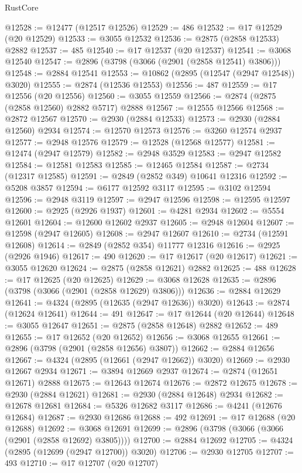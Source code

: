 \begin{lexlean}{RustCore}
\begin{coremodule}
@12528 := @12477 (@12517 @12526)
@12529 := 486
@12532 := @17 @12529 (@20 @12529)
@12533 := @3055 @12532
@12536 := @2875 (@2858 @12533) @2882
@12537 := 485
@12540 := @17 @12537 (@20 @12537)
@12541 := @3068 @12540
@12547 := @2896 (@3798 (@3066 (@2901 (@2858 @12541) @3806)))
@12548 := @2884 @12541
@12553 := @10862 (@2895 (@12547 (@2947 @12548)) @3020)
@12555 := @2874 (@12536 @12553)
@12556 := 487
@12559 := @17 @12556 (@20 @12556)
@12560 := @3055 @12559
@12566 := @2874 (@2875 (@2858 @12560) @2882 @5717) @2888
@12567 := @12555 @12566
@12568 := @2872 @12567
@12570 := @2930 (@2884 @12533)
@12573 := @2930 (@2884 @12560) @2934
@12574 := @12570 @12573
@12576 := @3260 @12574 @2937
@12577 := @2948 @12576
@12579 := @12528 (@12568 @12577)
@12581 := @12474 (@2947 @12579)
@12582 := @2948 @3529
@12583 := @2947 @12582
@12584 := @12581 @12583
@12585 := @12465 @12584
@12587 := @2734 (@12317 @12585)
@12591 := @2849 (@2852 @349) @10641 @12316
@12592 := @5208 @3857
@12594 := @6177 @12592 @3117
@12595 := @3102 @12594
@12596 := @2948 @3119
@12597 := @2947 @12596
@12598 := @12595 @12597
@12600 := @2925 (@2926 @1937)
@12601 := @4281 @2934
@12602 := @5554 @12601
@12604 := @12600 @12602 @2937
@12605 := @2948 @12604
@12607 := @12598 (@2947 @12605)
@12608 := @2947 @12607
@12610 := @2734 (@12591 @12608)
@12614 := @2849 (@2852 @354) @11777 @12316
@12616 := @2925 (@2926 @1946)
@12617 := 490
@12620 := @17 @12617 (@20 @12617)
@12621 := @3055 @12620
@12624 := @2875 (@2858 @12621) @2882
@12625 := 488
@12628 := @17 @12625 (@20 @12625)
@12629 := @3068 @12628
@12635 := @2896 (@3798 (@3066 (@2901 (@2858 @12629) @3806)))
@12636 := @2884 @12629
@12641 := @4324 (@2895 (@12635 (@2947 @12636)) @3020)
@12643 := @2874 (@12624 @12641)
@12644 := 491
@12647 := @17 @12644 (@20 @12644)
@12648 := @3055 @12647
@12651 := @2875 (@2858 @12648) @2882
@12652 := 489
@12655 := @17 @12652 (@20 @12652)
@12656 := @3068 @12655
@12661 := @2896 (@3798 (@2901 (@2858 @12656) @3807))
@12662 := @2884 @12656
@12667 := @4324 (@2895 (@12661 (@2947 @12662)) @3020)
@12669 := @2930 @12667 @2934
@12671 := @3894 @12669 @2937
@12674 := @2874 (@12651 @12671) @2888
@12675 := @12643 @12674
@12676 := @2872 @12675
@12678 := @2930 (@2884 @12621)
@12681 := @2930 (@2884 @12648) @2934
@12682 := @12678 @12681
@12684 := @5326 @12682 @3117
@12686 := @4241 (@12676 @12684)
@12687 := @2930 @12686
@12688 := 492
@12691 := @17 @12688 (@20 @12688)
@12692 := @3068 @12691
@12699 := @2896 (@3798 (@3066 (@3066 (@2901 (@2858 @12692) @3805))))
@12700 := @2884 @12692
@12705 := @4324 (@2895 (@12699 (@2947 @12700)) @3020)
@12706 := @2930 @12705
@12707 := 493
@12710 := @17 @12707 (@20 @12707)

\end{coremodule}
\end{lexlean}
